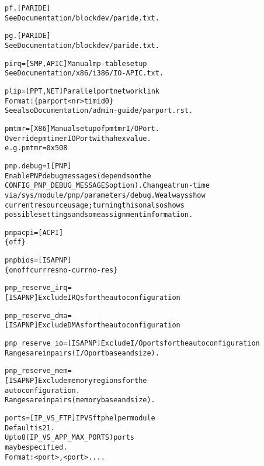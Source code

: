 \documentclass[a4paper,8pt,english]{sphinxmanual}
\begin{document}
\begin{alltt}
        pf.             {[}PARIDE{]}
                        See Documentation/blockdev/paride.txt.

        pg.             {[}PARIDE{]}
                        See Documentation/blockdev/paride.txt.

        pirq=           {[}SMP,APIC{]} Manual mp-table setup
                        See Documentation/x86/i386/IO-APIC.txt.

        plip=           {[}PPT,NET{]} Parallel port network link
                        Format: \{ parport\textless{}nr\textgreater{} \textbar{} timid \textbar{} 0 \}
                        See also Documentation/admin-guide/parport.rst.

        pmtmr=          {[}X86{]} Manual setup of pmtmr I/O Port.
                        Override pmtimer IOPort with a hex value.
                        e.g. pmtmr=0x508

        pnp.debug=1     {[}PNP{]}
                        Enable PNP debug messages (depends on the
                        CONFIG\_PNP\_DEBUG\_MESSAGES option).  Change at run-time
                        via /sys/module/pnp/parameters/debug.  We always show
                        current resource usage; turning this on also shows
                        possible settings and some assignment information.

        pnpacpi=        {[}ACPI{]}
                        \{ off \}

        pnpbios=        {[}ISAPNP{]}
                        \{ on \textbar{} off \textbar{} curr \textbar{} res \textbar{} no-curr \textbar{} no-res \}

        pnp\_reserve\_irq=
                        {[}ISAPNP{]} Exclude IRQs for the autoconfiguration

        pnp\_reserve\_dma=
                        {[}ISAPNP{]} Exclude DMAs for the autoconfiguration

        pnp\_reserve\_io= {[}ISAPNP{]} Exclude I/O ports for the autoconfiguration
                        Ranges are in pairs (I/O port base and size).

        pnp\_reserve\_mem=
                        {[}ISAPNP{]} Exclude memory regions for the
                        autoconfiguration.
                        Ranges are in pairs (memory base and size).

        ports=          {[}IP\_VS\_FTP{]} IPVS ftp helper module
                        Default is 21.
                        Up to 8 (IP\_VS\_APP\_MAX\_PORTS) ports
                        may be specified.
                        Format: \textless{}port\textgreater{},\textless{}port\textgreater{}....


\end{alltt}
\end{document}
